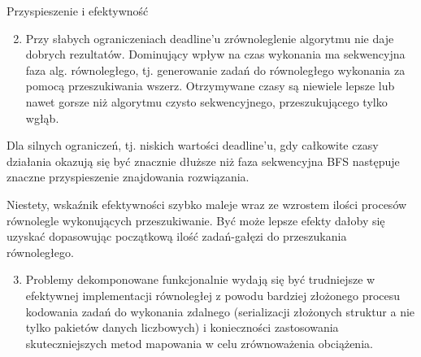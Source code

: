 \documentclass[ignorenonframetext,]{beamer}
\begin{document}
\begin{frame}[fragile]
\begin{block}{Przyspieszenie i efektywność}
\begin{enumerate}[1.]
\setcounter{enumi}{1}
\item
  Przy słabych ograniczeniach deadline'u zrównoleglenie algorytmu nie
  daje dobrych rezultatów. Dominujący wpływ na czas wykonania ma
  sekwencyjna faza alg. równoległego, tj. generowanie zadań do
  równoległego wykonania za pomocą przeszukiwania wszerz. Otrzymywane
  czasy są niewiele lepsze lub nawet gorsze niż algorytmu czysto
  sekwencyjnego, przeszukującego tylko wgłąb.
\end{enumerate}

Dla silnych ograniczeń, tj. niskich wartości deadline'u, gdy całkowite
czasy działania okazują się być znacznie dłuższe niż faza sekwencyjna
BFS następuje znaczne przyspieszenie znajdowania rozwiązania.

Niestety, wskaźnik efektywności szybko maleje wraz ze wzrostem ilości
procesów równolegle wykonujących przeszukiwanie. Być może lepsze efekty
dałoby się uzyskać dopasowując początkową ilość zadań-gałęzi do
przeszukania równoległego.

\begin{enumerate}[1.]
\setcounter{enumi}{2}
\item
  Problemy dekomponowane funkcjonalnie wydają się być trudniejsze w
  efektywnej implementacji równoległej z powodu bardziej złożonego
  procesu kodowania zadań do wykonania zdalnego (serializacji złożonych
  struktur a nie tylko pakietów danych liczbowych) i konieczności
  zastosowania skuteczniejszych metod mapowania w celu zrównoważenia
  obciążenia.
\end{enumerate}

\end{block}

\end{frame}
\end{document}
